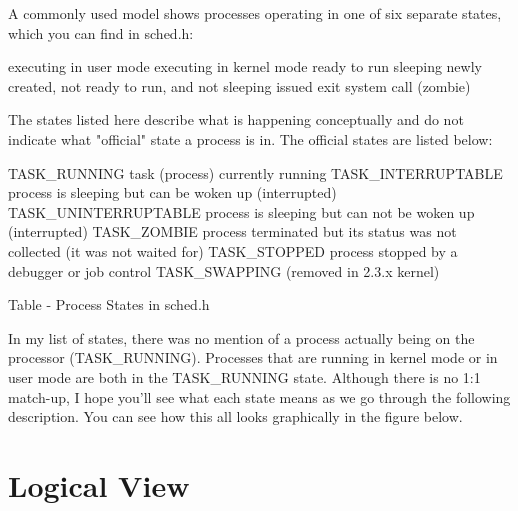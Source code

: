 \documentclass[12pt]{article}
\begin{document}
A commonly used model shows processes operating in one of six separate states, which you can find in sched.h:

    executing in user mode
    executing in kernel mode
    ready to run
    sleeping
    newly created, not ready to run, and not sleeping
    issued exit system call (zombie)

The states listed here describe what is happening conceptually and do not indicate what "official" state a process is in. The official states are listed below:

TASK\_RUNNING	task (process) currently running
TASK\_INTERRUPTABLE	process is sleeping but can be woken up (interrupted)
TASK\_UNINTERRUPTABLE  	process is sleeping but can not be woken up (interrupted)
TASK\_ZOMBIE	process terminated but its status was not collected (it was not waited for)
TASK\_STOPPED	process stopped by a debugger or job control
TASK\_SWAPPING	(removed in 2.3.x kernel)

Table - Process States in sched.h

In my list of states, there was no mention of a process actually being on the processor (TASK\_RUNNING). Processes that are running in kernel mode or in user mode are both in the TASK\_RUNNING state. Although there is no 1:1 match-up, I hope you'll see what each state means as we go through the following description. You can see how this all looks graphically in the figure below. 


\clearpage
\section{Logical View}


\clearpage
\end{document}
